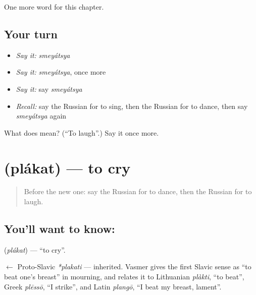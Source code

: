 \begin{grammarlens}[title={What you've built}]
One more word for this chapter.
\end{grammarlens}

\subsection*{Your turn}
\begin{itemize}
\raggedright
  \item \emph{Say it:} \emph{smeyátsya}
  \item \emph{Say it:} \emph{smeyátsya}, once more
  \item \emph{Say it:} say \emph{smeyátsya}
  \item \emph{Recall:} say the Russian for to sing, then the Russian for to dance, then say \emph{smeyátsya} again
\end{itemize}

\begin{tcolorbox}[breakable,colback=teal!4,colframe=teal!35!black,title={Before you move on}]
What does  mean? (\textquotedblleft{}To laugh\textquotedblright{}.) Say it once more.
\end{tcolorbox}
\section[\texorpdfstring{\ru{плакать} (plákat)}{плакать (plákat)}]{ (plákat) — to cry}

\label{lesson:RU-C38-plakat}



\begin{quote}
Before the new one: say the Russian for to dance, then the Russian for to laugh.
\end{quote}

\subsection*{You'll want to know: }
\textbf{} (\emph{plákat}) — \textquotedblleft{}to cry\textquotedblright{}.

\begin{cousinweb}
\textbf{} $\leftarrow$ Proto-Slavic \emph{*plakati} — inherited. Vasmer gives the first Slavic sense as \textquotedblleft{}to beat one's breast\textquotedblright{} in mourning, and relates it to Lithuanian \emph{plàkti}, \textquotedblleft{}to beat\textquotedblright{}, Greek \emph{plēssō}, \textquotedblleft{}I strike\textquotedblright{}, and Latin \emph{plangō}, \textquotedblleft{}I beat my breast, lament\textquotedblright{}.
\end{cousinweb}

